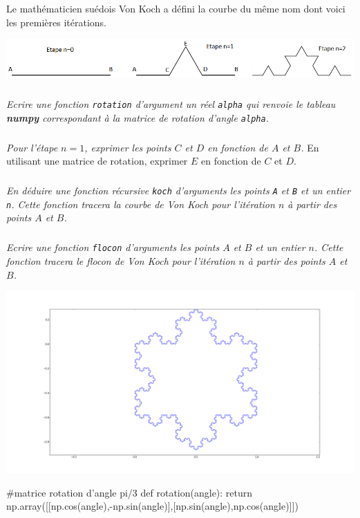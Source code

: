 \documentclass[10pt,fleqn]{article} %
\begin{document}
\begin{multicols}{2}
Le mathématicien suédois Von Koch a défini la courbe du même nom dont voici les premières itérations.

\begin{center}
\includegraphics[width=.95\linewidth]{images/etapes_flocon}
\end{center}

\subparagraph{}
\textit{Ecrire une fonction \texttt{rotation} d'argument un réel \texttt{alpha} qui renvoie le tableau \textbf{numpy} correspondant à la matrice de rotation d'angle \texttt{alpha}.}

\subparagraph{}
\textit{Pour l'étape $n=1$, exprimer les points $C$ et $D$ en fonction de $A$ et $B$.}
En utilisant une matrice de rotation, exprimer $E$ en fonction de $C$ et $D$.

\subparagraph{}
\textit{En déduire une fonction récursive \texttt{koch} d'arguments les points \texttt{A} et \texttt{B} et un entier \texttt{n}. Cette fonction tracera la courbe de Von Koch pour l'itération $n$ à partir des points $A$ et $B$.}

\subparagraph{}
\textit{Ecrire une fonction \texttt{flocon} d'arguments les points $A$ et $B$ et un entier $n$. Cette fonction tracera le flocon de Von Koch pour l'itération $n$ à partir des points $A$ et $B$.}

\begin{center}
\includegraphics[width=.95\linewidth]{images/flocon_von_koch}
\end{center}

\ifprof
\begin{corrige}
\begin{python}
#matrice rotation d'angle pi/3
def rotation(angle):
    return np.array([[np.cos(angle),-np.sin(angle)],[np.sin(angle),np.cos(angle)]])


\end{python}
\end{corrige}
\end{multicols}
\end{document}
